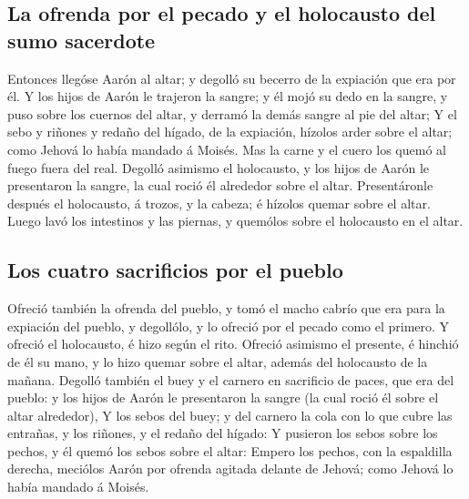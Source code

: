 \hypertarget{la-ofrenda-por-el-pecado-y-el-holocausto-del-sumo-sacerdote}{%
\subsection{La ofrenda por el pecado y el holocausto del sumo
sacerdote}\label{la-ofrenda-por-el-pecado-y-el-holocausto-del-sumo-sacerdote}}

 Entonces llegóse Aarón al altar; y degolló su becerro de la
expiación que era por él.  Y los hijos de Aarón le trajeron
la sangre; y él mojó su dedo en la sangre, y puso sobre los cuernos del
altar, y derramó la demás sangre al pie del altar;  Y el
sebo y riñones y redaño del hígado, de la expiación, hízolos arder sobre
el altar; como Jehová lo había mandado á Moisés.  Mas la
carne y el cuero los quemó al fuego fuera del real. 
Degolló asimismo el holocausto, y los hijos de Aarón le presentaron la
sangre, la cual roció él alrededor sobre el altar. 
Presentáronle después el holocausto, á trozos, y la cabeza; é hízolos
quemar sobre el altar.  Luego lavó los intestinos y las
piernas, y quemólos sobre el holocausto en el altar.

\hypertarget{los-cuatro-sacrificios-por-el-pueblo}{%
\subsection{Los cuatro sacrificios por el
pueblo}\label{los-cuatro-sacrificios-por-el-pueblo}}

 Ofreció también la ofrenda del pueblo, y tomó el macho
cabrío que era para la expiación del pueblo, y degollólo, y lo ofreció
por el pecado como el primero.  Y ofreció el holocausto, é
hizo según el rito.  Ofreció asimismo el presente, é
hinchió de él su mano, y lo hizo quemar sobre el altar, además del
holocausto de la mañana.  Degolló también el buey y el
carnero en sacrificio de paces, que era del pueblo: y los hijos de Aarón
le presentaron la sangre (la cual roció él sobre el altar alrededor),
 Y los sebos del buey; y del carnero la cola con lo que
cubre las entrañas, y los riñones, y el redaño del hígado: 
Y pusieron los sebos sobre los pechos, y él quemó los sebos sobre el
altar:  Empero los pechos, con la espaldilla derecha,
meciólos Aarón por ofrenda agitada delante de Jehová; como Jehová lo
había mandado á Moisés.

